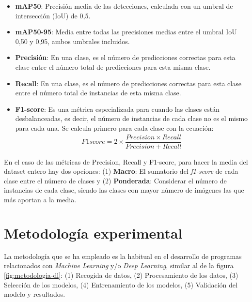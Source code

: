 \documentclass[11pt]{article}
\begin{document}
\begin{itemize}
    \item \textbf{mAP50}: Precisión media de las detecciones, calculada con un umbral de intersección (IoU) de 0,5.

    \item \textbf{mAP50-95}: Media entre todas las precisiones medias entre el umbral IoU 0,50 y 0,95, ambos umbrales incluidos.

    \item \textbf{Precisión}: En una clase, es el número de predicciones correctas para esta clase entre el número total de predicciones para esta misma clase.

    \item \textbf{Recall}: En una clase, es el número de predicciones correctas para esta clase entre el número total de instancias de esta misma clase.

    \item \textbf{F1-score}: Es una métrica especializada para cuando las clases están desbalanceadas, es decir, el número de instancias de cada clase no es el mismo para cada una. Se calcula primero para cada clase con la ecuación:
    \begin{gather*}
        F1score = 2 \times \dfrac{Precision \times Recall}{Precision + Recall}
    \end{gather*}
\end{itemize}

En el caso de las métricas de Precision, Recall y F1-score, para hacer la media del dataset entero hay dos opciones: (1) \textbf{Macro}: El sumatorio del \textit{f1-score} de cada clase entre el número de clases y (2) \textbf{Ponderada}: Considerar el número de instancias de cada clase, siendo las clases con mayor número de imágenes las que más aportan a la media.


\section{Metodología experimental}
\label{sec:met-exp}

La metodología que se ha empleado es la habitual en el desarrollo de programas relacionados con \textit{Machine Learning} y/o \textit{Deep Learning}, similar al de la figura \ref{fig:metodologia-dl}: (1) Recogida de datos, (2) Procesamiento de los datos, (3) Selección de los modelos, (4) Entrenamiento de los modelos, (5) Validación del modelo y resultados.
\end{document}
